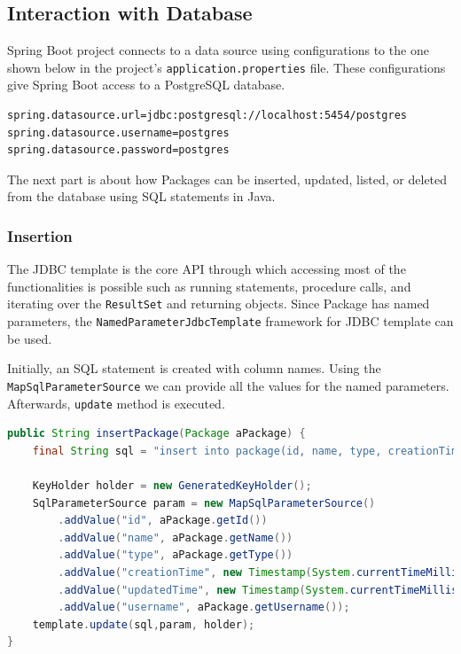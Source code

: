 \subsection{Interaction with Database}
\label{subsec:interaction-db}

Spring Boot project connects to a data source using configurations to the one shown below in the project’s \texttt{application.properties} file. These configurations give Spring Boot access to a PostgreSQL database. 

\begin{lstlisting}[language={XML}]
spring.datasource.url=jdbc:postgresql://localhost:5454/postgres
spring.datasource.username=postgres
spring.datasource.password=postgres
\end{lstlisting}

The next part is about how Packages can be inserted, updated, listed, or deleted from the database using SQL statements in Java.

\subsubsection{Insertion}
The JDBC template is the core API through which accessing most of the functionalities is possible such as running statements, procedure calls, and iterating over the \texttt{ResultSet} and returning objects. Since Package has named parameters, the \texttt{NamedParameterJdbcTemplate} framework for JDBC template can be used.

Initially, an SQL statement is created with column names. Using the \texttt{MapSqlParameterSource} we can provide all the values for the named parameters. Afterwards, \texttt{update} method is executed.

\begin{lstlisting}[language={Java}]
public String insertPackage(Package aPackage) {
    final String sql = "insert into package(id, name, type, creationTime, updatedTime, username) values(:id,:name,:type,:creationTime,:updatedTime,:username)";
    
    KeyHolder holder = new GeneratedKeyHolder();
    SqlParameterSource param = new MapSqlParameterSource()
        .addValue("id", aPackage.getId())
        .addValue("name", aPackage.getName())
        .addValue("type", aPackage.getType())
        .addValue("creationTime", new Timestamp(System.currentTimeMillis()))
        .addValue("updatedTime", new Timestamp(System.currentTimeMillis()))
        .addValue("username", aPackage.getUsername());
    template.update(sql,param, holder);
}
\end{lstlisting}

